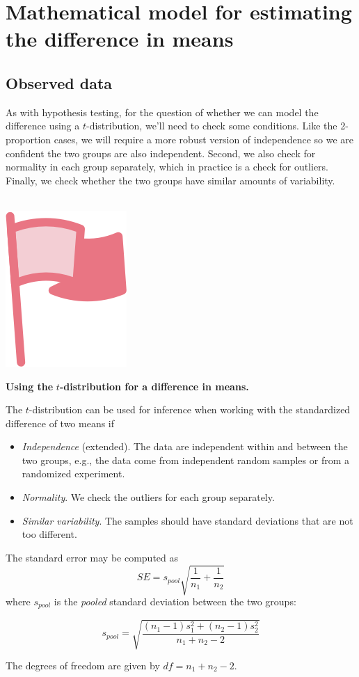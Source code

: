 \documentclass[
  10pt,
  openany]{book}
\providecommand{\tightlist}{%
  \setlength{\itemsep}{0pt}\setlength{\parskip}{0pt}}
\newenvironment{mdframedwithfootImportant}
{   
    \savenotes
    \begin{mdframed}[%
    topline=true, bottomline=true, linecolor=oiR, linewidth=0.5pt,
    rightline=false, leftline=false,
    backgroundcolor=oiLGray]
    \renewcommand{\thempfootnote}{\arabic{footnote}}
    }
{
    \end{mdframed}
    \spewnotes
}
\newenvironment{important}{
    \let\oldtextbf\textbf
    \renewcommand{\textbf}[1]{{\textcolor{oiR}{\oldtextbf{##1}}}}
\vspace{4mm}
\begin{mdframedwithfootImportant}
\begin{minipage}[t]{0.10\textwidth}
{$\:$ \\ \setkeys{Gin}{width=2.5em,keepaspectratio}\includegraphics{images/_icons/important.png}}
\end{minipage}
\hfill
\begin{minipage}[t]{0.90\textwidth}
\vspace{-2mm}
\setlength{\parskip}{1em}
}{\end{minipage}
\end{mdframedwithfootImportant}
\vspace{4mm}
}
\begin{document}
\hypertarget{mathematical-model-for-estimating-the-difference-in-means}{%
\section{Mathematical model for estimating the difference in means}\label{mathematical-model-for-estimating-the-difference-in-means}}

\hypertarget{observed-data-14}{%
\subsection{Observed data}\label{observed-data-14}}

As with hypothesis testing, for the question of whether we can model the difference using a \(t\)-distribution, we'll need to check some conditions.
Like the 2-proportion cases, we will require a more robust version of independence so we are confident the two groups are also independent.
Second, we also check for normality in each group separately, which in practice is a check for outliers.
Finally, we check whether the two groups have similar amounts of variability.


\begin{important}
\textbf{Using the} \(t\)\textbf{-distribution for a difference in means.}

The \(t\)-distribution can be used for inference when working with the standardized difference of two means if

\begin{itemize}
\tightlist
\item
  \emph{Independence} (extended). The data are independent within and between the two groups, e.g., the data come from independent random samples or from a randomized experiment.
\item
  \emph{Normality}. We check the outliers for each group separately.
\item
  \emph{Similar variability}. The samples should have standard deviations that are not too different.
\end{itemize}

The standard error may be computed as
\[
SE = s_{\textit{pool}} \sqrt{\frac{1}{n_1} + \frac{1}{n_2}}
\]
where \(s_{\textit{pool}}\) is the \emph{pooled} standard deviation between the two groups:

\[
s_{\textit{pool}} = \sqrt{\frac{(n_1 - 1) s^2_1 + (n_2 - 1) s^2_2}{n_1 + n_2 - 2}}
\]

The degrees of freedom are given by \(df = n_1 + n_2 - 2\).

\end{important}
\end{document}
